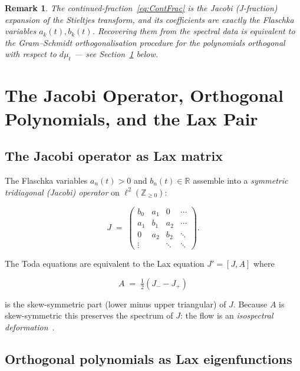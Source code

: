 \documentclass[12pt,a4paper]{article}
\newtheorem{remark}[theorem]{Remark}
\theoremstyle{definition}
\newcommand{\R}{\mathbb{R}}
\newcommand{\Z}{\mathbb{Z}}
\begin{document}
\begin{remark}
The continued-fraction~\eqref{eq:ContFrac} is the Jacobi (J-fraction)
expansion of the Stieltjes transform, and its coefficients are exactly the
Flaschka variables $a_k(t),b_k(t)$.  Recovering them from the spectral
data is equivalent to the Gram--Schmidt orthogonalisation procedure for
the polynomials orthogonal with respect to $d\mu_t$ --- see
Section~\ref{sec:OPs} below.
\end{remark}

\section{The Jacobi Operator, Orthogonal Polynomials, and the Lax Pair}
\label{sec:OPs}

\subsection{The Jacobi operator as Lax matrix}

The Flaschka variables $a_n(t)>0$ and $b_n(t)\in\R$ assemble into a
\emph{symmetric tridiagonal (Jacobi) operator} on $\ell^2(\Z_{\geq 0})$:

\begin{equation}\label{eq:Jacobi}
  J \;=\; \begin{pmatrix}
    b_0 & a_1 & 0   & \cdots \\
    a_1 & b_1 & a_2 & \cdots \\
    0   & a_2 & b_2 & \ddots \\
    \vdots & & \ddots & \ddots
  \end{pmatrix}.
\end{equation}

The Toda equations are equivalent to the Lax equation $J' = [J,A]$ where

\begin{equation}\label{eq:Afactor}
  A \;=\; \tfrac{1}{2}(J_- - J_+)
\end{equation}

is the skew-symmetric part (lower minus upper triangular) of $J$.
Because $A$ is skew-symmetric this preserves the spectrum of $J$: the
flow is an \emph{isospectral deformation}~\cite{Flaschka1974,Miller2018}.

\subsection{Orthogonal polynomials as Lax eigenfunctions}
\end{document}
